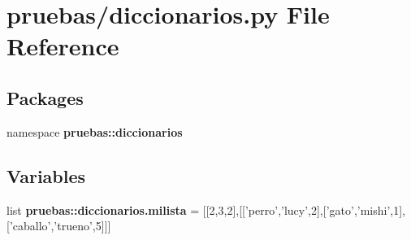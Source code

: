 \section{pruebas/diccionarios.py \-File \-Reference}
\label{diccionarios_8py}
\subsection*{\-Packages}
\begin{DoxyCompactItemize}
\item 
namespace {\bf pruebas\-::diccionarios}
\end{DoxyCompactItemize}
\subsection*{\-Variables}
\begin{DoxyCompactItemize}
\item 
list {\bf pruebas\-::diccionarios.\-milista} = [[2,3,2],[['perro','lucy',2],['gato','mishi',1],['caballo','trueno',5]]]
\end{DoxyCompactItemize}
